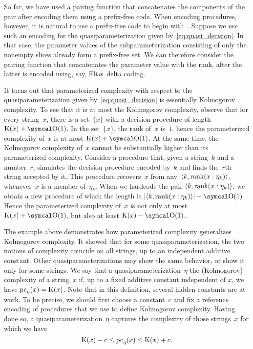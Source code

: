 \begin{example}
\label{ex:traditional_pc}%
  So far, we have used a pairing function that concatenates the components of the pair after encoding them using a prefix-free code.
  When encoding procedures, however, it is natural to use a prefix-free code to begin with~\parencite{li2008introduction}.
  Suppose we use such an encoding for the quasiparameterization given by~\eqref{eq:quasi_decision}.
  In that case, the parameter values of the subparameterization consisting of only the nonempty slices already form a prefix-free set.
  We can therefore consider the pairing function that concatenates the parameter value with the rank, after the latter is encoded using, say, Elias~delta coding.

  It turns out that parameterized complexity with respect to the quasiparameterization given by~\eqref{eq:quasi_decision} is essentially Kolmogorov complexity.
  To see that it is at most the Kolmogorov complexity, observe that for every string~$x$, there is a set~$\{x\}$ with a decision procedure of length $\KC(x) + \bigO(1)$.
  In the set~$\{x\}$, the rank of~$x$ is~$1$, hence the parameterized complexity of~$x$ is at most $\KC(x) + \bigO(1)$.
  At the same time, the Kolmogorov complexity of~$x$ cannot be substantially higher than its parameterized complexity.
  Consider a procedure that, given a string~$k$ and a number~$r$, simulates the decision procedure encoded by~$k$ and finds the~$r$th string accepted by it.
  This procedure recovers~$x$ from any~${\langle k, \operatorname{rank}(x : \eta_k)\rangle}$, whenever~$x$ is a member of~$\eta_k$.
  When we hardcode the pair ${\langle k, \operatorname{rank}(x : \eta_k)\rangle}$, we obtain a new procedure of which the length is $\length{\pair{k}{\rank(x : \eta_k)}} + \bigO(1)$.
  Hence the parameterized complexity of~$x$ is not only at most $\KC(x) + \bigO(1)$, but also at least $\KC(x) - \bigO(1)$.
\end{example}

The example above demonstrates how parameterized complexity generalizes Kolmogorov complexity.
It showed that for some quasiparameterization, the two notions of complexity coincide on all strings, up to an independent additive constant.
Other quasiparameterizations may show the same behavior, or show it only for some strings.
We say that a quasiparameterization~$\eta$  the (Kolmogorov) complexity of a string~$x$ if, up to a fixed additive constant independent of $x$, we have $\operatorname{pc}_\eta(x) = \operatorname{K}(x)$.
Note that in this definition, several hidden constants are at work.
To be precise, we should first choose a constant~$c$ and fix a reference encoding of procedures that we use to define Kolmogorov complexity.
Having done so, a quasiparameterization~$\eta$ captures the complexity of those strings~$x$ for which we have
\begin{equation*}
  \operatorname{K}(x) - c \le \operatorname{pc}_\eta(x) \le \operatorname{K}(x) + c.
\end{equation*}

